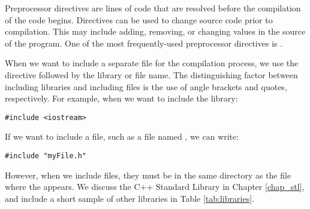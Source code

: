 
Preprocessor directives are lines of code that are resolved before the compilation of the code begins.
Directives can be used to change source code prior to compilation.
This may include adding, removing, or changing values in the source of the program.
One of the most frequently-used preprocessor directives is .


When we want to include a separate file for the compilation process, we use the directive  followed by the library or file name. 
The distinguishing factor between including libraries and including files is the use of angle brackets and quotes, respectively. 
For example, when we want to include the  library: 

\noindent\begin{minipage}{\linewidth}\begin{lstlisting}
#include <iostream> 
\end{lstlisting}\end{minipage}

If we want to include a file, such as a file named , we can write: 

\noindent\begin{minipage}{\linewidth}\begin{lstlisting}
#include "myFile.h"
\end{lstlisting}\end{minipage}

However, when we include files, they must be in the same directory as the file where the  appears. 
We discuss the C++ Standard Library in Chapter \ref{chap_stl}, and include a short sample of other libraries in Table \ref{tab:libraries}.

